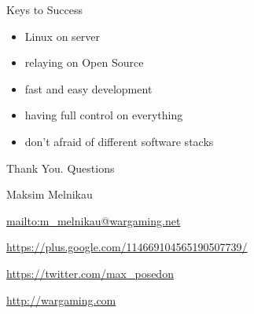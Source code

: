 \documentclass[aspectratio=169]{beamer}
\begin{document}
{
\begin{frame}[plain]{}
\end{frame}
}

\begin{frame}{Keys to Success}
    \begin{itemize}
        \item Linux on server
        \item relaying on Open Source
        \item fast and easy development
        \item having full control on everything
        \item don't afraid of different software stacks
    \end{itemize}
\end{frame}

{

\begin{frame}{Thank You. Questions}
    \begin{block}{Maksim Melnikau}
    \par \url{mailto:m\_melnikau@wargaming.net}
    \par \url{https://plus.google.com/114669104565190507739/}
    \par \url{https://twitter.com/max\_posedon}
    \par \url{http://wargaming.com}
    \end{block}
\end{frame}
}
\end{document}
